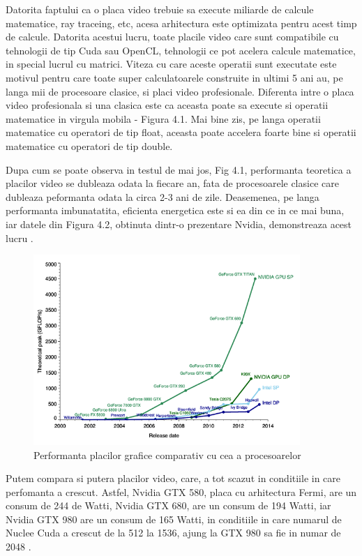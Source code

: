 
Datorita faptului ca o placa video trebuie sa execute miliarde de calcule matematice, ray traceing,
etc, acesa arhitectura este optimizata pentru acest timp de calcule. Datorita acestui lucru, toate placile
video care sunt compatibile cu tehnologii de tip Cuda sau OpenCL, tehnologii ce pot acelera calcule matematice, in
special lucrul cu matrici. Viteza cu care aceste operatii sunt executate este motivul pentru care
toate super calculatoarele construite in ultimi 5 ani au, pe langa mii de procesoare clasice, si
placi video profesionale. Diferenta intre o placa video profesionala si una clasica este ca aceasta
poate sa execute si operatii matematice in virgula mobila - Figura 4.1. Mai bine zis, pe langa operatii
matematice cu operatori de tip float, aceasta poate accelera foarte bine si operatii matematice cu operatori de
tip double.

Dupa cum se poate observa in testul de mai jos, Fig 4.1, performanta teoretica a placilor video se dubleaza
odata la fiecare an, fata de procesoarele clasice care dubleaza peformanta odata la circa 2-3 ani
de zile. Deasemenea, pe langa performanta imbunatatita, eficienta energetica este si ea din ce in
ce mai buna, iar datele din Figura 4.2, obtinuta dintr-o prezentare Nvidia, demonstreaza acest lucru . 

\begin{figure}[ht] \centering
\includegraphics[width=0.9\textwidth]{img/gpu.png}
\caption{Performanta placilor grafice comparativ cu cea a procesoarelor} \end{figure}


Putem compara si putera placilor video, care, a tot scazut in conditiile in care perfomanta a
crescut. Astfel, Nvidia GTX 580, placa cu arhitectura Fermi, are un consum de 244 de Watti\cite{580}, Nvidia GTX 680,
are un consum de 194 Watti\cite{680}, iar Nvidia GTX 980 are un consum de 165 Watti, in conditiile in care
numarul de Nuclee Cuda a crescut de la 512 la 1536, ajung la GTX 980 sa fie in numar de 2048
\cite{980}.


